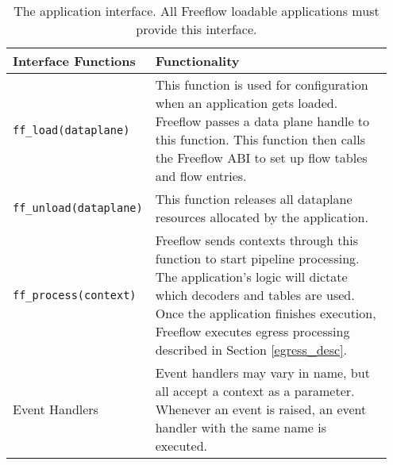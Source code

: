 \begin{table}[ht]
\caption{The application interface. All Freeflow loadable applications must provide this interface.}
\begin{center}
\begin{tabular}{| p{0.3\linewidth} | p{0.65\linewidth} |}
\hline
Interface Functions & Functionality \\

\hline

\texttt{ff\_load(dataplane)} & This function is used for configuration when an application gets loaded. Freeflow passes a data plane handle to this function. This function then calls the Freeflow ABI to set up flow tables and flow entries. \\

\hline

\texttt{ff\_unload(dataplane)} & This function releases all dataplane resources allocated by the application. \\

\hline

\texttt{ff\_process(context)} & Freeflow sends contexts through this function to start pipeline processing. The application's logic will dictate which decoders and tables are used. Once the application finishes execution, Freeflow executes egress processing described in Section \ref{egress_desc}. \\

\hline
Event Handlers & Event handlers may vary in name, but all accept a context as a parameter. Whenever an event is raised, an event handler with the same name is executed.\\
\hline

\end{tabular}
\end{center}
\label{tbl:steve_api}
\end{table}

